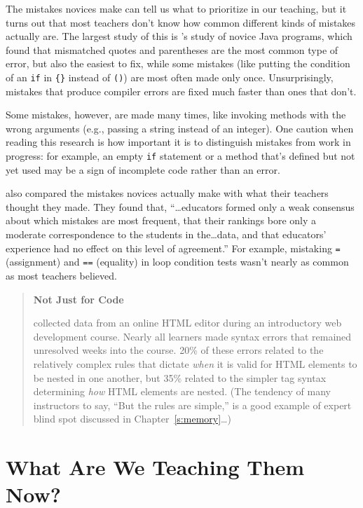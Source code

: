 The mistakes novices make can tell us what to prioritize in our
teaching, but it turns out that most teachers don't know how common
different kinds of mistakes actually are. The largest study of this is
\cite{Brow2017}'s study of novice Java programs, which found that
mismatched quotes and parentheses are the most common type of error, but
also the easiest to fix, while some mistakes (like putting the condition
of an \texttt{if} in \texttt{\{\}} instead of \texttt{()}) are most often made only once.
Unsurprisingly, mistakes that produce compiler errors are fixed much
faster than ones that don't.

Some mistakes, however, are made many times, like invoking methods with
the wrong arguments (e.g., passing a string instead of an integer). One
caution when reading this research is how important it is to distinguish
mistakes from work in progress: for example, an empty \texttt{if} statement or
a method that's defined but not yet used may be a sign of incomplete
code rather than an error.

\cite{Brow2017} also compared the mistakes novices actually make with
what their teachers thought they made. They found that,
``\ldots{}educators formed only a weak consensus about which
mistakes are most frequent, that their rankings bore only a moderate
correspondence to the students in the\ldots{}data, and that
educators' experience had no effect on this level of agreement.'' For
example, mistaking \texttt{=} (assignment) and \texttt{==} (equality) in loop
condition tests wasn't nearly as common as most teachers believed.

\begin{quote}\setlength{\parindent}{0pt}
\textbf{Not Just for Code}

\cite{Park2015} collected data from an online HTML editor during an
introductory web development course. Nearly all learners made syntax
errors that remained unresolved weeks into the course. 20\% of these
errors related to the relatively complex rules that dictate \emph{when} it
is valid for HTML elements to be nested in one another, but 35\%
related to the simpler tag syntax determining \emph{how} HTML elements are
nested. (The tendency of many instructors to say, ``But the rules are
simple,'' is a good example of expert blind spot discussed in
Chapter~\ref{s:memory}\ldots{})
\end{quote}

\section{What Are We Teaching Them Now?}\label{s:pck-now}

